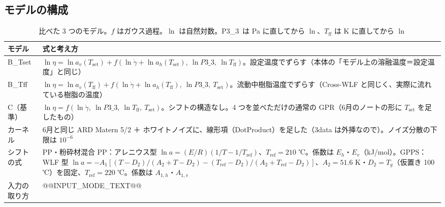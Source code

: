 \documentclass[paper=a4paper,fontsize=10.5pt,line_length=44zw,number_of_lines=38]{jlreq}
\newcommand{\gd}{\dot{\gamma}}
\newcommand{\Tff}{T_{\mathrm{ff}}}
\newcommand{\Tset}{T_{\mathrm{set}}}
\newcommand{\Eh}{E_{h}}
\newcommand{\Ev}{E_{v}}
\newcommand{\PIII}{P3\_3}
\begin{document}
\subsection{モデルの構成}
\begin{table}[H]
\caption{比べた 3 つのモデル。$f$ はガウス過程。$\ln$ は自然対数。\PIII\ は Pa に直してから $\ln$、$\Tff$ は K に直してから $\ln$}\label{tab:model}
\small
\begin{tabularx}{\linewidth}{@{}l>{\raggedright\arraybackslash}X@{}}
\toprule
モデル & 式と考え方 \\
\midrule
B\_Tset & $\ln\eta=\ln a_v(\Tset)+f(\ln\gd+\ln a_h(\Tset),\ \ln\PIII,\ \ln\Tff)$。設定温度でずらす（本体の「モデル上の溶融温度＝設定温度」と同じ） \\
B\_Tff & $\ln\eta=\ln a_v(\Tff)+f(\ln\gd+\ln a_h(\Tff),\ \ln\PIII,\ \Tset)$。流動中樹脂温度でずらす（Cross-WLF と同じく、実際に流れている樹脂の温度） \\
C（基準） & $\ln\eta=f(\ln\gd,\ \ln\PIII,\ \ln\Tff,\ \Tset)$。シフトの構造なし。4 つを並べただけの通常の GPR（6月のノートの形に $\Tset$ を足したもの） \\
\midrule
カーネル & 6月と同じ ARD Matern 5/2 ＋ ホワイトノイズに、線形項（DotProduct）を足した（3data は外挿なので）。ノイズ分散の下限は $10^{-6}$ \\
シフトの式 & PP・粉砕材混合 PP：アレニウス型 $\ln a=(E/R)(1/T-1/T_{\mathrm{ref}})$、$T_{\mathrm{ref}}=210$ ℃。係数は $\Eh$・$\Ev$（kJ/mol）。GPPS：WLF 型 $\ln a=-A_1[(T-D_2)/(A_2+T-D_2)-(T_{\mathrm{ref}}-D_2)/(A_2+T_{\mathrm{ref}}-D_2)]$、$A_2=51.6$ K・$D_2=T_g$（仮置き 100 ℃）を固定、$T_{\mathrm{ref}}=220$ ℃。係数は $A_{1,h}$・$A_{1,v}$ \\
入力の取り方 & @@INPUT_MODE_TEXT@@ \\
\bottomrule
\end{tabularx}
\end{table}
\end{document}
